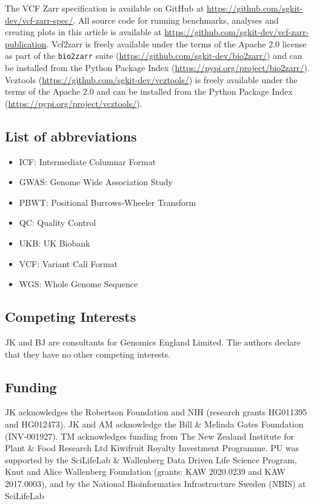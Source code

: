 \documentclass[a4paper,num-refs]{oup-contemporary}
\begin{document}
The VCF Zarr specification is available on GitHub at 
\url{https://github.com/sgkit-dev/vcf-zarr-spec/}.
All source code for running benchmarks, analyses and creating 
plots in this article is available at
\url{https://github.com/sgkit-dev/vcf-zarr-publication}.
Vcf2zarr is freely available under the terms of the Apache 2.0 
license as part of the \texttt{bio2zarr} 
suite (\url{https://github.com/sgkit-dev/bio2zarr/}) 
and can be installed from the Python Package Index
(\url{https://pypi.org/project/bio2zarr/}).
Vcztools (\url{https://github.com/sgkit-dev/vcztools/}) 
is freely available under the terms of the Apache 2.0 
and can be installed from the Python Package Index
(\url{https://pypi.org/project/vcztools/}).

\subsection{List of abbreviations}

\begin{itemize}
    \item ICF: Intermediate Columnar Format
    \item GWAS: Genome Wide Association Study
    \item PBWT: Positional Burrows-Wheeler Transform
    \item QC: Quality Control
    \item UKB: UK Biobank
    \item VCF: Variant Call Format
    \item WGS: Whole Genome Sequence
\end{itemize}

\subsection{Competing Interests}
JK and BJ are consultants for Genomics England Limited.
The authors declare that they have no other competing interests.

\subsection{Funding}
JK acknowledges the Robertson Foundation and 
NIH (research grants HG011395 and HG012473). 
JK and AM acknowledge the Bill \& Melinda Gates Foundation (INV-001927).
TM acknowledges funding from The New Zealand Institute for Plant \& Food
Research Ltd Kiwifruit Royalty Investment Programme.
PU was supported by the SciLifeLab \& Wallenberg Data Driven Life
Science Program, Knut and Alice Wallenberg Foundation (grants: KAW
2020.0239 and KAW 2017.0003), and by the National Bioinformatics
Infrastructure Sweden (NBIS) at SciLifeLab
\end{document}
